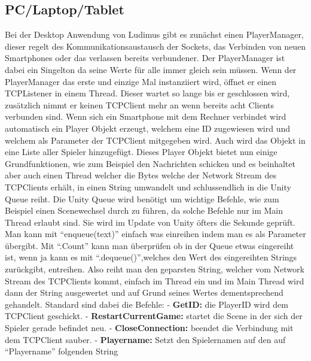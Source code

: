 \subsection{PC/Laptop/Tablet}
Bei der Desktop Anwendung von Ludimus gibt es zunächst einen PlayerManager, dieser regelt des Kommunikationsaustausch der Sockets, das Verbinden von neuen Smartphones oder das verlassen bereits verbundener. Der PlayerManager ist dabei ein Singelton da seine Werte für alle immer gleich sein müssen. Wenn der PlayerManager das erste und einzige Mal instanziiert wird, öffnet er einen TCPListener in einem Thread. Dieser wartet so lange bis er geschlossen wird, zusätzlich nimmt er keinen TCPClient mehr an wenn bereits acht Clients verbunden sind. Wenn sich ein Smartphone mit dem Rechner verbindet wird automatisch ein Player Objekt erzeugt, welchem eine ID zugewiesen wird und welchem als Parameter der TCPClient mitgegeben wird. Auch wird das Objekt in eine Liste aller Spieler hinzugefügt. Dieses Player Objekt bietet nun einige Grundfunktionen, wie zum Beispiel den Nachrichten schicken und es beinhaltet aber auch einen Thread welcher die Bytes welche der Network Stream des TCPClients erhält, in einen String umwandelt und schlussendlich in die Unity Queue reiht. Die Unity Queue wird benötigt um wichtige Befehle, wie zum Beispiel einen Scenewechsel durch zu führen, da solche Befehle nur im Main Thread erlaubt sind. Sie wird im Update von Unity öfters die Sekunde geprüft. Man kann mit “enqueue(text)” einfach was einreihen indem man es als Parameter übergibt. Mit “.Count” kann man überprüfen ob in der Queue etwas eingereiht ist, wenn ja kann es mit “.dequeue()”,welches den Wert des eingereihten Strings zurückgibt, entreihen. Also reiht man den geparsten String, welcher vom Network Stream des TCPClients kommt, einfach im Thread ein und im Main Thread wird dann der String ausgewertet und auf Grund seines Wertes dementsprechend gehandelt. Standard sind dabei die Befehle:
\newline \tab 
- \textbf{GetID:} die PlayerID wird dem TCPClient geschickt.
\newline \tab  
- \textbf{RestartCurrentGame:} startet die Scene in der sich der Spieler gerade befindet \tab neu.
\newline \tab 
- \textbf{CloseConnection:} beendet die Verbindung mit dem TCPClient sauber.
\newline \tab 
- \textbf{Playername:} Setzt den Spielernamen auf den auf “Playername” folgenden String
